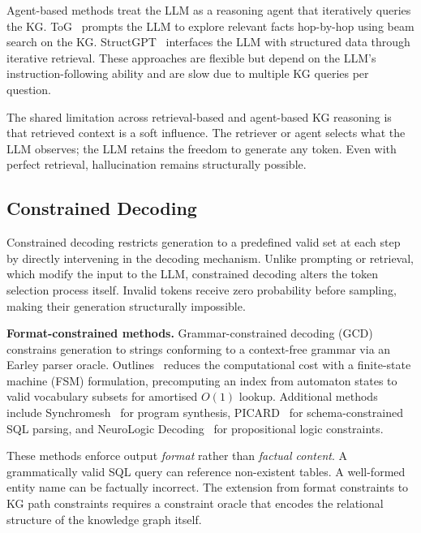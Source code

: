 Agent-based methods treat the LLM as a reasoning agent that iteratively queries the
KG. ToG~\citep{sun2024tog} prompts the LLM to explore relevant facts hop-by-hop using
beam search on the KG. StructGPT~\citep{jiang2023structgpt} interfaces the LLM with
structured data through iterative retrieval. These approaches are flexible but depend
on the LLM's instruction-following ability and are slow due to multiple KG queries per
question.

The shared limitation across retrieval-based and agent-based KG reasoning is that
retrieved context is a soft influence. The retriever or agent selects what the LLM
observes; the LLM retains the freedom to generate any token. Even with perfect retrieval,
hallucination remains structurally possible.

\subsection{Constrained Decoding}
\label{sec:related:constrained}

Constrained decoding restricts generation to a predefined valid set at each step by
directly intervening in the decoding mechanism. Unlike prompting or retrieval, which
modify the input to the LLM, constrained decoding alters the token selection process
itself. Invalid tokens receive zero probability before sampling, making their generation
structurally impossible.

\textbf{Format-constrained methods.} Grammar-constrained decoding
(GCD)~\citep{geng2023grammarconstrained} constrains generation to strings conforming to
a context-free grammar via an Earley parser oracle. Outlines~\citep{willard2023outlines}
reduces the computational cost with a finite-state machine (FSM) formulation,
precomputing an index from automaton states to valid vocabulary subsets for amortised
$O(1)$ lookup. Additional methods include Synchromesh~\citep{poesia2022synchromesh} for
program synthesis, PICARD~\citep{scholak2021picard} for schema-constrained SQL parsing,
and NeuroLogic Decoding~\citep{lu2021neurologic} for propositional logic constraints.

These methods enforce output \textit{format} rather than \textit{factual content}. A
grammatically valid SQL query can reference non-existent tables. A well-formed entity
name can be factually incorrect. The extension from format constraints to KG path
constraints requires a constraint oracle that encodes the relational structure of the
knowledge graph itself.

